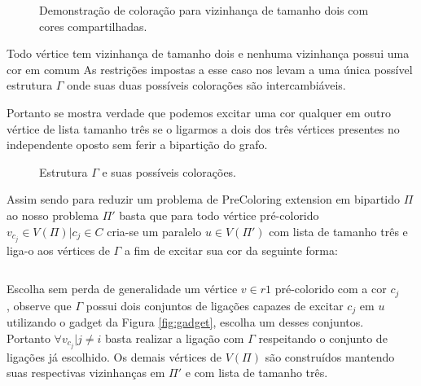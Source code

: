 \documentclass[9pt, compress]{beamer}
\newcommand{\?}{\textcolor{warn}{\textit{?}}}
\begin{document}
     \begin{frame}
       \begin{figure}[H]
     \centering
     \fontsize{5}{10}
     
     \caption{Demonstração de coloração para vizinhança de tamanho dois com cores compartilhadas.}
   \end{figure}
     \end{frame}
     \begin{frame}{Todo vértice tem vizinhança de tamanho dois e nenhuma vizinhança possui uma cor em comum}
       As restrições impostas a esse caso nos levam a uma única possível estrutura $\Gamma$ onde suas duas possíveis colorações são intercambiáveis.
       
       Portanto se mostra verdade que podemos excitar uma cor qualquer em outro vértice de lista tamanho três se o ligarmos a dois dos três vértices presentes no independente oposto sem ferir a bipartição do grafo.
     \end{frame}
     \begin{frame}
      \begin{figure}[H]
        \centering
        \fontsize{4}{10}
        
        \caption{Estrutura $\Gamma$ e suas possíveis colorações.}
        \label{fig:2-edge-b}
      \end{figure}
      
      Assim sendo para reduzir um problema de PreColoring extension em bipartido $\Pi$ ao nosso problema $\Pi'$ basta que para todo vértice pré-colorido $v_{c_j} \in V(\Pi) | c_j \in C$ cria-se um paralelo $u \in V(\Pi')$ com lista de tamanho três e liga-o aos vértices de $\Gamma$ a fim de excitar sua cor da seguinte forma:
      
     \end{frame}
     \begin{frame}
       \begin{columns}
        \begin{column}{0.5\textwidth}
          Escolha sem perda de generalidade um vértice $v \in r1$ pré-colorido com a cor $c_j$, observe que $\Gamma$ possui dois conjuntos de ligações capazes de excitar $c_j$ em $u$ utilizando o gadget da Figura \ref{fig:gadget}, escolha um desses conjuntos. Portanto $\forall v_{c_j} | j \neq i$ basta realizar a ligação com $\Gamma$ respeitando o conjunto de ligações já escolhido. Os demais vértices de $V(\Pi)$ são construídos mantendo suas respectivas vizinhanças em $\Pi'$ e com lista de tamanho três.
        \end{column}
        \begin{column}{0.5\textwidth}
        \end{column}
      \end{columns}
     \end{frame}
     
\end{document}
